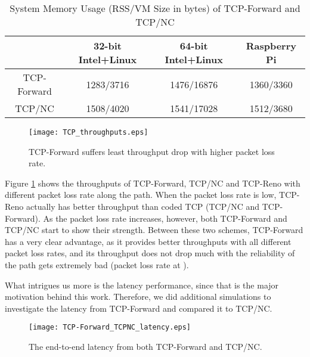 \documentclass[10pt, conference, final, letterpaper]{IEEEtran}
\theoremstyle{definition}
\begin{document}
\begin{table*}[bht]
	\centering
\caption{System Memory Usage (RSS/VM Size in bytes) of TCP-Forward and TCP/NC}
\begin{tabular}{|c|c|c|c|} \hline
	&32-bit Intel+Linux &64-bit Intel+Linux &Raspberry Pi\\ \hline
	TCP-Forward&1283/3716&1476/16876&1360/3360\\ \hline
	TCP/NC&1508/4020&1541/17028&1512/3680 \\ \hline
\end{tabular}
\label{table:TCP:mems}
\end{table*}

\begin{figure}[htb]
	\begin{center}
		\texttt{[image: TCP\_throughputs.eps]}
	\end{center}
	\caption{TCP-Forward suffers least throughput drop with higher packet loss rate.}
	\label{fig:tcpforward:throughputs}
\end{figure}

Figure \ref{fig:tcpforward:throughputs} shows the throughputs of TCP-Forward, TCP/NC and TCP-Reno with different packet loss rate along the path. When the packet loss rate is low, TCP-Reno actually has better throughput than coded TCP (TCP/NC and TCP-Forward). As the packet loss rate increases, however, both TCP-Forward and TCP/NC start to show their strength. Between these two schemes, TCP-Forward has a very clear advantage, as it provides better throughputs with all different packet loss rates, and its throughput does not drop much with the reliability of the path gets extremely bad (packet loss rate at ).

What intrigues us more is the latency performance, since that is the major motivation behind this work. Therefore, we did additional simulations to investigate the latency from TCP-Forward and compared it to TCP/NC.

\begin{figure}[htb]
	\begin{center}
		\texttt{[image: TCP-Forward\_TCPNC\_latency.eps]}
	\end{center}
	\caption{The end-to-end latency from both TCP-Forward and TCP/NC.}
	\label{fig:tcpforward:tcpnc}
\end{figure}
\end{document}
